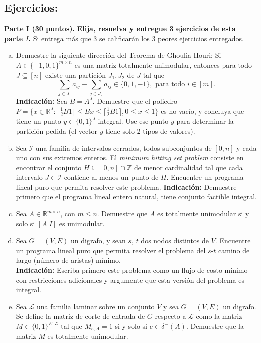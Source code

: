 \documentclass{article}
\newcommand{\RR}{\mathbb R}
\newcommand{\ZZ}{\mathbb Z}
\theoremstyle{plain}
\theoremstyle{definition}
\theoremstyle{Azul}
\begin{document}
\subsection*{Ejercicios:}
\noindent \textbf{Parte I (30 puntos).} \textbf{Elija, resuelva y entregue 3 ejercicios de esta parte $I$.} Si entrega más que 3 se calificarán los 3 peores ejercicios entregados.
\begin{enumerate}[(a)]
\item Demuestre la siguiente dirección del Teorema de Ghoulia-Houri: 
Si $A\in \{-1,0,1\}^{m\times n}$ es una matriz totalmente unimodular, entonces para todo $J\subseteq [n]$ existe una partición $J_1, J_2$ de $J$ tal que
$$\sum_{j\in J_1}a_{ij}-\sum_{j\in J_2}a_{ij} \in \{0,1,-1\}, \text{ para todo } i \in [m].$$
\textbf{Indicación:} Sea $B=A^J$. Demuestre que el poliedro $P=\{x\in \RR^J\colon \lfloor \frac12 B 1 \rfloor \leq Bx\leq \lceil \frac12 B 1\rceil, 0\leq x \leq 1\}$ es no vacío, y concluya que tiene un punto  $y\in \{0,1\}^J$ integral. Use ese punto $y$ para determinar la partición pedida (el vector $y$ tiene solo 2 tipos de valores).
\item Sea $\mathcal{I}$ una familia de intervalos cerrados, todos subconjuntos de $[0,n]$ y cada uno con sus extremos enteros. El \emph{minimum hitting set problem} consiste en encontrar el conjunto $H\subseteq [0,n]\cap \ZZ$ de menor cardinalidad tal que cada intervalo $J\in \mathcal{I}$ contiene al menos un punto de $H$. Encuentre un programa lineal puro que permita resolver este problema. \textbf{Indicación:} Demuestre primero que el programa lineal entero natural, tiene conjunto factible integral.
\item Sea $A\in \RR^{m\times n}$, con $m\leq n$. Demuestre que $A$ es totalmente unimodular si y solo si $[A | I]$ es unimodular.
\item Sea $G=(V,E)$ un digrafo, y sean $s$, $t$ dos nodos distintos de $V$. Encuentre un programa lineal puro que permita resolver el problema del $s$-$t$ camino de largo (número de aristas) mínimo.\\ \textbf{Indicación:} Escriba primero este problema como un flujo de costo mínimo con restricciones adicionales y argumente que esta versión del problema es integral.
\item Sea $\mathcal{L}$ una familia laminar sobre un conjunto $V$ y sea $G=(V,E)$ un digrafo. Se define la matriz de corte de entrada de $G$ respecto a $\mathcal{L}$ como la matriz $M\in \{0,1\}^{E,\mathcal{L}}$ tal que $M_{e, A}=1$ si y solo si $e\in \delta^-(A)$. 
Demuestre que la matriz $M$ es totalmente unimodular.


\end{enumerate}
\end{document}
